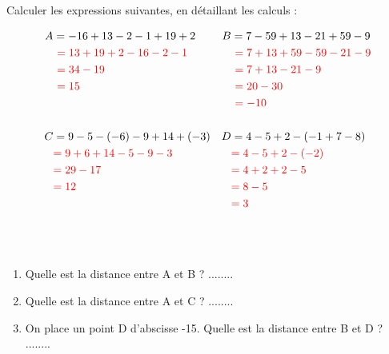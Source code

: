 \documentclass[Controlev1-correction]{subfiles}
\begin{document}
\begin{exercice}[(8 points)] Calculer les expressions suivantes, en détaillant les calculs :

	\begin{align*}
		A & = -16 + 13 - 2 - 1 + 19 + 2               & B & = 7 - 59 + 13 - 21 + 59 - 9                \\
		  & \ \correction{= 13 + 19 + 2 - 16 - 2 - 1} &   & \ \correction{= 7 + 13 + 59 - 59 - 21 - 9} \\
		  & \ \correction{= 34 - 19}                  &   & \ \correction{= 7 + 13 - 21 - 9}           \\
		  & \ \correction{= 15}                       &   & \ \correction{= 20 - 30}                   \\
		  &                                           &   & \ \correction{= -10}                       \\
		\\
		C & = 9 - 5 - (-6) - 9 + 14 + (-3)            & D & = 4 - 5 + 2 - (-1 + 7 - 8)                 \\
		  & \correction{= 9 + 6 + 14 - 5 - 9 - 3}     &   & \correction{= 4 - 5 + 2 - (-2)}            \\
		  & \correction{= 29 - 17}                    &   & \correction{= 4 + 2 + 2 - 5}               \\
		  & \correction{= 12}                         &   & \correction{= 8 - 5}                       \\
		  &                                           &   & \correction{= 3}                           \\
		\\
	\end{align*}
\end{exercice}

\begin{exercice}[(3 points)]\

	\begin{center}
	\end{center}

	\begin{enumerate}
		\item Quelle est la distance entre A et B ? ........
		\item Quelle est la distance entre A et C ? ........
		\item On place un point D d'abscisse -15. Quelle est la distance entre B et D ? ........
	\end{enumerate}
\end{exercice}
\end{document}
